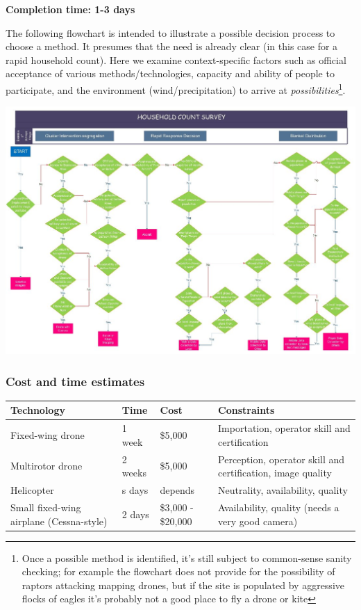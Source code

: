 \documentclass[a4paper,12pt,twoside]{article}
\begin{document}
\noindent
\textbf{Completion time: 1-3 days}

The following flowchart is intended to illustrate a possible decision process to choose a method. It presumes that the need is already clear (in this case for a rapid household count). Here we examine context-specific factors such as official acceptance of various methods/technologies, capacity and ability of people to participate, and the environment (wind/precipitation) to arrive at \textit{possibilities}\footnote{Once a possible method is identified, it's still subject to common-sense sanity checking; for example the flowchart does not provide for the possibility of raptors attacking mapping drones, but if the site is populated by aggressive flocks of eagles it's probably not a good place to fly a drone or kite}.

\includegraphics[width=1\textwidth]{images/Household_Count.jpeg}

\subsubsection{Cost and time estimates}

\begin{center}
\begin{tabular}{| m{6em} | m{2cm}| m{2cm} | m{5cm} |}
\hline
Technology & Time & Cost & Constraints  \\
\hline \hline
Fixed-wing drone & 1 week & \$5,000 & Importation, operator skill and certification \\
\hline
Multirotor drone & 2 weeks & \$5,000 & Perception, operator skill and certification, image quality \\
\hline
Helicopter & s days & depends & Neutrality, availability, quality \\
\hline
Small fixed-wing airplane (Cessna-style) & 2 days & \$3,000 - \$20,000 & Availability, quality (needs a very good camera) \\
\hline

\end{tabular}
\end{center}
\end{document}
